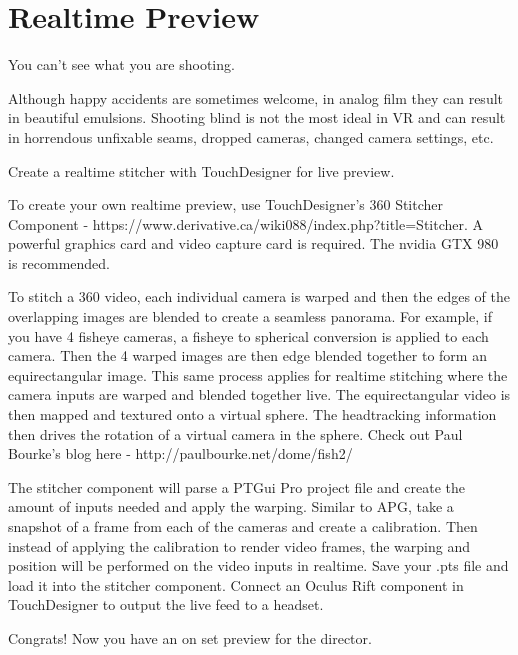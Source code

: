 \chapter{Realtime Preview}
\pagecolor{white}
\label{chap:11}
\begin{fullwidth}

\problem

{\large You can’t see what you are shooting.  \par}


Although happy accidents are sometimes welcome, in analog film they can result in beautiful emulsions.  Shooting blind is not the most ideal in VR and can result in horrendous unfixable seams, dropped cameras, changed camera settings, etc. 


\solution

{\large Create a realtime stitcher with TouchDesigner for live preview. 
 \par}

To create your own realtime preview, use TouchDesigner’s 360 Stitcher Component - https://www.derivative.ca/wiki088/index.php?title=Stitcher. A powerful graphics card and video capture card is required. The nvidia GTX 980 is recommended. 

To stitch a 360 video, each individual camera is warped and then the edges of the overlapping images are blended to create a seamless panorama. For example, if you have 4 fisheye cameras, a fisheye to spherical conversion is applied to each camera. Then the 4 warped images are then edge blended together to form an equirectangular image. This same process applies for realtime stitching where the camera inputs are warped and blended together live. The equirectangular video is then mapped and textured onto a virtual sphere. The headtracking information then drives the rotation of a virtual camera in the sphere. Check out Paul Bourke's blog here - http://paulbourke.net/dome/fish2/

The stitcher component will parse a PTGui Pro project file and create the amount of inputs needed and apply the warping. Similar to APG, take a snapshot of a frame from each of the cameras and create a calibration. Then instead of applying the calibration to render video frames, the warping and position will be performed on the video inputs in realtime. Save your .pts file and load it into the stitcher component. Connect an Oculus Rift component in TouchDesigner to output the live feed to a headset.

Congrats! Now you have an on set preview for the director.



\clearpage
\end{fullwidth}
